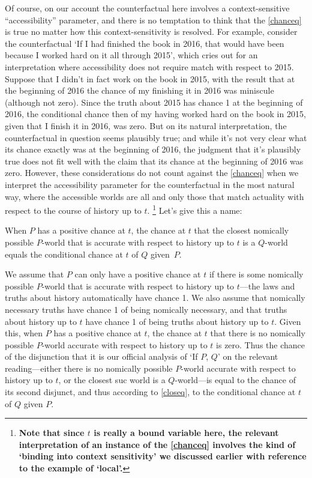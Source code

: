 \documentclass[If.tex]{subfiles}
\begin{document}
Of course, on our account the counterfactual here involves a context-sensitive “accessibility” parameter, and there is no temptation to think that the \ref{chanceq} is true no matter how this context-sensitivity is resolved. For example, consider the counterfactual ‘If I had finished the book in 2016, that would have been because I worked hard on it all through 2015’, which cries out for an interpretation where accessibility does not require match with respect to 2015. Suppose that I didn't in fact work on the book in 2015, with the result that at the beginning of 2016 the chance of my finishing it in 2016 was miniscule (although not zero). Since the truth about 2015 has chance 1 at the beginning of 2016, the conditional chance then of my having worked hard on the book in 2015, given that I finish it in 2016, was zero. But on its natural interpretation, the counterfactual in question seems plausibly true; and while it's not very clear what its chance exactly was at the beginning of 2016, the judgment that it's plausibly true does not fit well with the claim that its chance at the beginning of 2016 was zero. However, these considerations do not count against the \ref{chanceq} when we interpret the accessibility parameter for the counterfactual in the most natural way, where the accessible worlds are all and only those that match actuality with respect to the course of history up to $t$.%
\footnote{\textbf{Note that since $t$ is really a bound variable here, the relevant interpretation of an instance of the \ref{chanceq} involves the kind of ‘binding into context sensitivity’ we discussed earlier with reference to the example of ‘local’.}}
Let's give this a name:
\begin{prop}
	\litem[Chance-Eq] \label{closeq}
	When $P$ has a positive chance at $t$, the chance at $t$ that the closest nomically possible $P$-world that is accurate with respect to history up to $t$ is a $Q$-world equals the conditional chance at $t$ of $Q$ given~$P$.	
\end{prop}
We assume that $P$ can only have a positive chance at $t$ if there is some nomically possible $P$-world that is accurate with respect to history up to $t$---the laws and truths about history automatically have chance 1.  We also assume that nomically necessary truths have chance 1 of being nomically necessary, and that truths about history up to $t$ have chance 1 of being truths about history up to $t$.  Given this, when $P$ has a positive chance at $t$, the chance at $t$ that there is no nomically possible $P$-world accurate with respect to history up to $t$ is zero.  Thus the chance of the disjunction that it is our official analysis of ‘If $P$, $Q$’ on the relevant reading---either there is no nomically possible $P$-world accurate with respect to history up to $t$, or the closest suc world is a $Q$-world---is equal to the chance of its second disjunct, and thus according to \ref{closeq}, to the conditional chance at $t$ of $Q$ given $P$.
\end{document}
